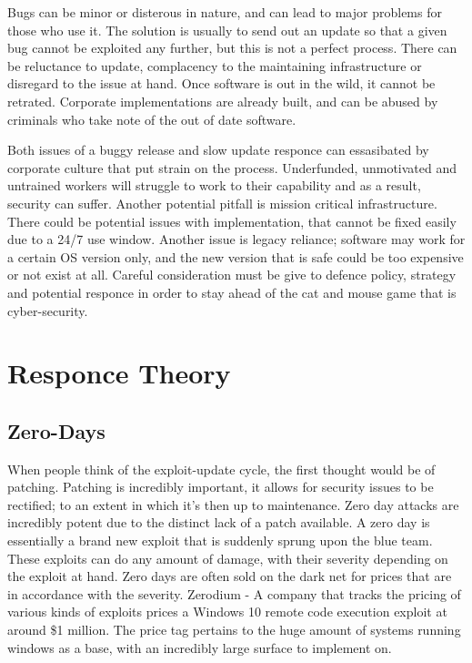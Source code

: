 Bugs can be minor or disterous in nature, and can lead to major problems for those who use it.
The solution is usually to send out an update so that a given bug cannot be exploited any further, but this is not a perfect process. There can be reluctance to update, complacency to the maintaining infrastructure or disregard to the issue at hand.
Once software is out in the wild, it cannot be retrated. Corporate implementations are already built, and can be abused by criminals who take note of the out of date software.

Both issues of a buggy release and slow update responce can essasibated by corporate culture that put strain on the process. Underfunded, unmotivated and untrained workers will struggle to work to their capability and as a result, security can suffer. 
Another potential pitfall is mission critical infrastructure. There could be potential issues with implementation, that cannot be fixed easily due to a 24/7 use window. Another issue is legacy reliance; software may work for a certain OS version only, 
and the new version that is safe could be too expensive or not exist at all. Careful consideration must be give to defence policy, strategy and potential responce in order to stay ahead of the cat and mouse game that is cyber-security.



\section{Responce Theory}


\subsection{Zero-Days}
When people think of the exploit-update cycle, the first thought would be of patching. Patching is incredibly important, it allows for security issues to be rectified; to an extent in which it's then up to maintenance. Zero day attacks are incredibly 
potent due to the distinct lack of a patch available. A zero day is essentially a brand new exploit that is suddenly sprung upon the blue team. These exploits can do any amount of damage, with their severity depending on the exploit at hand. 
Zero days are often sold on the dark net for prices that are in accordance with the severity. Zerodium - A company that tracks the pricing of various kinds of exploits prices a Windows 10 remote code execution exploit at around \$1 million. 
The price tag pertains to the huge amount of systems running windows as a base, with an incredibly large surface to implement on.

